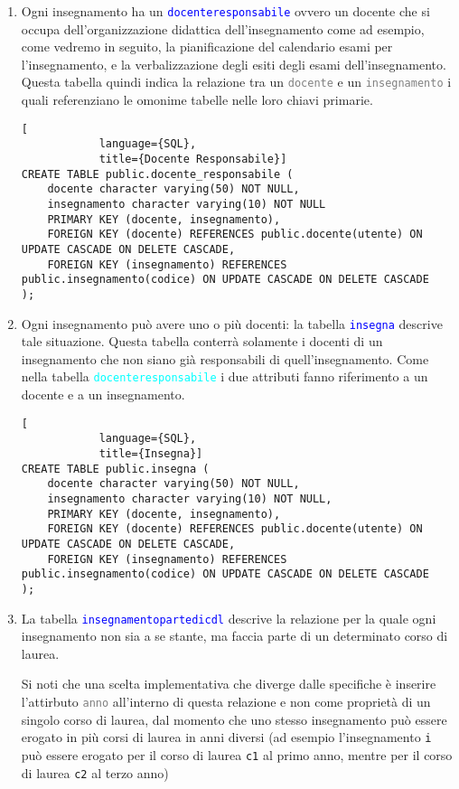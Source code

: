 \documentclass{article}
\newcommand{\tabb}[1]{\texttt{\textcolor{blue}{#1}}}
\newcommand{\tab}[1]{\texttt{\textcolor{cyan}{#1}}}
\newcommand{\attr}[1]{\texttt{\textcolor{gray}{#1}}}
\newcommand{\und}[0]{\textunderscore}
\newcommand{\alert}[0]{\textcolor{red}{\faExclamationCircle}}
\begin{document}
\begin{enumerate}
        \item Ogni insegnamento ha un \tabb{docente\und responsabile} ovvero un docente che si occupa dell'organizzazione didattica dell'insegnamento come ad esempio, come vedremo in seguito, la pianificazione del calendario esami per l'insegnamento, e la verbalizzazione degli esiti degli esami dell'insegnamento.
        Questa tabella quindi indica la relazione tra un \attr{docente} e un \attr{insegnamento} i quali referenziano le omonime tabelle nelle loro chiavi primarie.

        \pagebreak

        \begin{lstlisting}[
            language={SQL},
            title={Docente Responsabile}]
CREATE TABLE public.docente_responsabile (
    docente character varying(50) NOT NULL,
    insegnamento character varying(10) NOT NULL
    PRIMARY KEY (docente, insegnamento),
    FOREIGN KEY (docente) REFERENCES public.docente(utente) ON UPDATE CASCADE ON DELETE CASCADE,
    FOREIGN KEY (insegnamento) REFERENCES public.insegnamento(codice) ON UPDATE CASCADE ON DELETE CASCADE
);
        \end{lstlisting}

        \item Ogni insegnamento può avere uno o più docenti: la tabella \tabb{insegna} descrive tale situazione. Questa tabella conterrà solamente i docenti di un insegnamento che non siano già responsabili di quell'insegnamento. Come nella tabella \tab{docente\und responsabile} i due attributi fanno riferimento a un docente e a un insegnamento.
        \begin{lstlisting}[
            language={SQL},
            title={Insegna}]
CREATE TABLE public.insegna (
    docente character varying(50) NOT NULL,
    insegnamento character varying(10) NOT NULL,
    PRIMARY KEY (docente, insegnamento),
    FOREIGN KEY (docente) REFERENCES public.docente(utente) ON UPDATE CASCADE ON DELETE CASCADE,
    FOREIGN KEY (insegnamento) REFERENCES public.insegnamento(codice) ON UPDATE CASCADE ON DELETE CASCADE
);
        \end{lstlisting}

        \item La tabella \tabb{insegnamento\und parte\und di\und cdl} descrive la relazione per la quale ogni insegnamento non sia a se stante, ma faccia parte di un determinato corso di laurea.


        \alert Si noti che una scelta implementativa che diverge dalle specifiche è inserire l'attirbuto \attr{anno} all'interno di questa relazione e non come proprietà di un singolo corso di laurea, dal momento che uno stesso insegnamento può essere erogato in più corsi di laurea in anni diversi (ad esempio l'insegnamento \texttt{i} può essere erogato per il corso di laurea \texttt{c1} al primo anno, mentre per il corso di laurea \texttt{c2} al terzo anno)


\end{enumerate}
\end{document}
